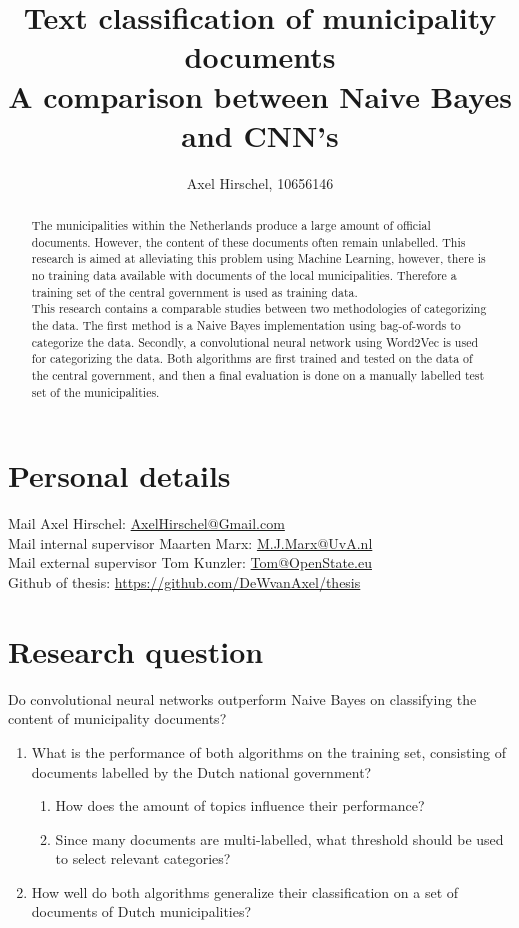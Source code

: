 \documentclass[a4paper]{article}
\begin{document}
\title{Text classification of municipality documents\\
A comparison between Naive Bayes and CNN's} %
\author{Axel Hirschel, 10656146}

\maketitle

\begin{abstract}
The municipalities within the Netherlands produce a large amount of official documents. However, the content of these documents often remain unlabelled. This research is aimed at alleviating this problem using Machine Learning, however, there is no training data available with documents of the local municipalities. Therefore a training set of the central government is used as training data.\\
This research contains a comparable studies between two methodologies of categorizing the data. The first method is a Naive Bayes implementation using bag-of-words to categorize the data. Secondly, a convolutional neural network using Word2Vec is used for categorizing the data. Both algorithms are first trained and tested on the data of the central government, and then a final evaluation is done on a manually labelled test set of the municipalities.
\end{abstract}

\section{Personal details}
Mail Axel Hirschel: \href{mailto:AxelHirschel@gmail.com}{AxelHirschel@Gmail.com}\\
Mail internal supervisor Maarten Marx: \href{mailto:m.j.marx@uva.nl}{M.J.Marx@UvA.nl}\\
Mail external supervisor Tom Kunzler: \href{mailto:tom@openstate.eu}{Tom@OpenState.eu}\\
Github of thesis: \url{https://github.com/DeWvanAxel/thesis}

\section{Research question}
Do convolutional neural networks outperform Naive Bayes on classifying the content of municipality documents?
\begin{enumerate}
\item What is the performance of both algorithms on the training set, consisting of documents labelled by the Dutch national government?
\begin{enumerate}
\item How does the amount of topics influence their performance?
\item Since many documents are multi-labelled, what threshold should be used to select relevant categories?
\end{enumerate}
\item How well do both algorithms generalize their classification on a set of documents of Dutch municipalities?
\end{enumerate}
\end{document}
